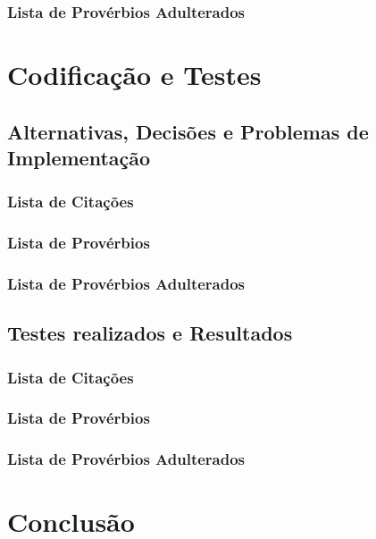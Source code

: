 \documentclass[11pt,a4paper]{report}
\begin{document}
\subsection{Lista de Provérbios Adulterados}


\chapter{Codificação e Testes}
\label{chap:codificacao}

\section{Alternativas, Decisões e Problemas de Implementação}
\subsection{Lista de Citações}


\subsection{Lista de Provérbios}


\subsection{Lista de Provérbios Adulterados}


\section{Testes realizados e Resultados}
\subsection{Lista de Citações}


\subsection{Lista de Provérbios}


\subsection{Lista de Provérbios Adulterados}


\chapter{Conclusão}
\label{chap:concl}
\end{document}
